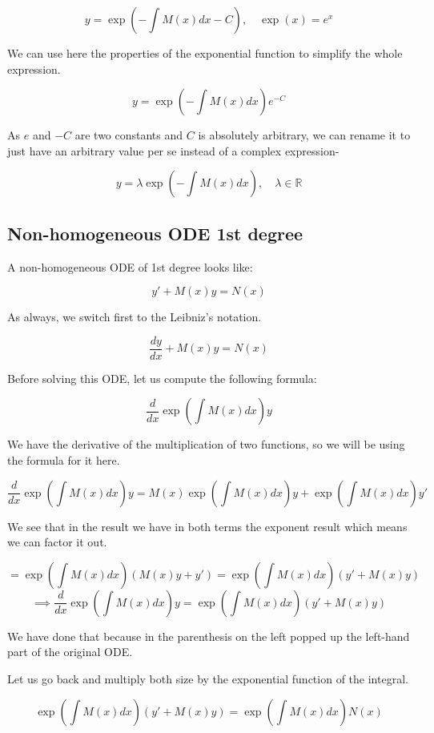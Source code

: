 \documentclass[12pt]{article}
\begin{document}
	\[
		y = \exp\left(-\int M(x) dx - C\right), \quad \exp(x) = e^x
	\]
	
	We can use here the properties of the exponential function to simplify the whole expression.
	
	\[
		y = \exp\left(-\int M(x) dx\right) e^{-C}
	\]
	
	As $e$ and $-C$ are two constants and $C$ is absolutely arbitrary, we can rename it to just have an arbitrary value per se instead of a complex expression-
	
	\[
		y = \lambda \exp\left(-\int M(x) dx\right), \quad \lambda \in \mathbb{R}
	\]
	
	\subsection{Non-homogeneous ODE 1st degree}
	
	A non-homogeneous ODE of 1st degree looks like:
	
	\[
		y' + M(x)y = N(x)
	\]
	
	As always, we switch first to the Leibniz's notation.
	
	\[
		\frac{dy}{dx} + M(x)y = N(x)
	\]
	
	Before solving this ODE, let us compute the following formula:
	
	\[
		\frac{d}{dx} \exp\left(\int M(x) dx\right) y
	\]
	
	We have the derivative of the multiplication of two functions, so we will be using the formula for it here.
	
	\[
		\frac{d}{dx} \exp\left(\int M(x) dx\right) y
		= M(x) \exp\left( \int M(x) dx \right) y + \exp\left( \int M(x) dx \right) y'
	\]
	
	We see that in the result we have in both terms the exponent result which means we can factor it out.
	
	\[
		= \exp\left( \int M(x) dx \right) (M(x) y + y')
		= \exp\left( \int M(x) dx \right) (y' + M(x) y)
	\]
	\[
		\implies \frac{d}{dx} \exp\left(\int M(x) dx\right) y = \exp\left( \int M(x) dx \right) (y' + M(x) y)
	\]
	
	We have done that because in the parenthesis on the left popped up the left-hand part of the original ODE.
	
	Let us go back and multiply both size by the exponential function of the integral.
	
	\[
		\exp\left( \int M(x) dx \right) (y' + M(x) y) = \exp\left( \int M(x) dx \right) N(x)
	\]
	
\end{document}
